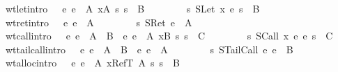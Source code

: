 \begin{isabellebody}
\isanewline
\ \ wt{\isacharunderscore}let{\isacharbrackleft}intro{\isacharbang}{\isacharbrackright}{\isacharcolon}\ {\isachardoublequoteopen}{\isasymlbrakk}\ {\isasymGamma}\ {\isasymturnstile}\isactrlisub e\ e\ {\isacharcolon}\ A{\isacharsemicolon}\ {\isacharparenleft}x{\isacharcomma}A{\isacharparenright}{\isacharhash}{\isasymGamma}\ {\isasymturnstile}\isactrlisub s\ s\ {\isacharcolon}\ B\ {\isasymrbrakk}\ {\isasymLongrightarrow}\isanewline
\ \ \ \ \ {\isasymGamma}\ {\isasymturnstile}\isactrlisub s\ SLet\ x\ e\ s\ {\isacharcolon}\ B{\isachardoublequoteclose}\ {\isacharbar}\isanewline
\ \ wt{\isacharunderscore}ret{\isacharbrackleft}intro{\isacharbang}{\isacharbrackright}{\isacharcolon}\ {\isachardoublequoteopen}{\isasymlbrakk}\ {\isasymGamma}\ {\isasymturnstile}\isactrlisub e\ e\ {\isacharcolon}\ A\ {\isasymrbrakk}\ {\isasymLongrightarrow}\isanewline
\ \ \ \ \ {\isasymGamma}\ {\isasymturnstile}\isactrlisub s\ SRet\ e\ {\isacharcolon}\ A{\isachardoublequoteclose}\ {\isacharbar}\isanewline
\ \ wt{\isacharunderscore}call{\isacharbrackleft}intro{\isacharbang}{\isacharbrackright}{\isacharcolon}\ {\isachardoublequoteopen}{\isasymlbrakk}\ {\isasymGamma}\ {\isasymturnstile}\isactrlisub e\ e\ {\isacharcolon}\ A\ {\isasymrightarrow}\ B{\isacharsemicolon}\ {\isasymGamma}\ {\isasymturnstile}\isactrlisub e\ e{\isacharprime}\ {\isacharcolon}\ A{\isacharsemicolon}\ {\isacharparenleft}x{\isacharcomma}B{\isacharparenright}{\isacharhash}{\isasymGamma}\ {\isasymturnstile}\isactrlisub s\ s\ {\isacharcolon}\ C\ {\isasymrbrakk}\ {\isasymLongrightarrow}\isanewline
\ \ \ \ \ {\isasymGamma}\ {\isasymturnstile}\isactrlisub s\ SCall\ x\ e\ e{\isacharprime}\ s\ {\isacharcolon}\ C{\isachardoublequoteclose}\ {\isacharbar}\isanewline
\ \ wt{\isacharunderscore}tailcall{\isacharbrackleft}intro{\isacharbang}{\isacharbrackright}{\isacharcolon}\ {\isachardoublequoteopen}{\isasymlbrakk}\ {\isasymGamma}\ {\isasymturnstile}\isactrlisub e\ e\ {\isacharcolon}\ A\ {\isasymrightarrow}\ B{\isacharsemicolon}\ {\isasymGamma}\ {\isasymturnstile}\isactrlisub e\ e{\isacharprime}\ {\isacharcolon}\ A\ {\isasymrbrakk}\ {\isasymLongrightarrow}\isanewline
\ \ \ \ \ {\isasymGamma}\ {\isasymturnstile}\isactrlisub s\ STailCall\ e\ e{\isacharprime}\ {\isacharcolon}\ B{\isachardoublequoteclose}\ {\isacharbar}\isanewline
\ \ wt{\isacharunderscore}alloc{\isacharbrackleft}intro{\isacharbang}{\isacharbrackright}{\isacharcolon}\ {\isachardoublequoteopen}{\isasymlbrakk}\ {\isasymGamma}\ {\isasymturnstile}\isactrlisub e\ e\ {\isacharcolon}\ A{\isacharsemicolon}\ {\isacharparenleft}x{\isacharcomma}RefT\ A{\isacharparenright}{\isacharhash}{\isasymGamma}\ {\isasymturnstile}\isactrlisub s\ s\ {\isacharcolon}\ B\ {\isasymrbrakk}\ {\isasymLongrightarrow}\isanewline

\end{isabellebody}
